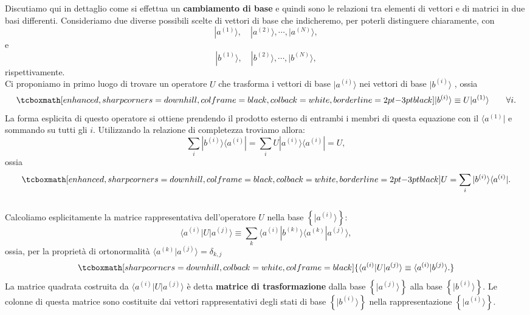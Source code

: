 Discutiamo qui in dettaglio come si effettua un \textbf{cambiamento di base} e quindi sono le relazioni tra elementi di vettori e di matrici in due basi differenti. Consideriamo due diverse possibili scelte di vettori di base che indicheremo, per poterli distinguere chiaramente, con 
	\begin{equation}
		| a^{(1)} \rangle , \quad  | a^{(2)} \rangle , \cdots , | a^{(N)} \rangle ,
	\end{equation}
e
	\begin{equation}
		| b^{(1)} \rangle , \quad | b^{(2)} \rangle , \cdots , | b^{(N)} \rangle ,
	\end{equation}
rispettivamente. \\

Ci proponiamo in primo luogo di trovare un operatore $U$ che trasforma i vettori di base $| a^{(i)} \rangle$ nei vettori di base $| b^{(i)} \rangle $ , ossia 
	\begin{equation}
		\tcboxmath[enhanced, sharp corners=downhill, colframe=black, colback=white, borderline={2pt}{-3pt}{black}]{
			| b^{(i)} \rangle \equiv U | a^{(1)} \rangle 
			}\qquad \forall i .
	\end{equation}
La forma esplicita di questo operatore si ottiene prendendo il prodotto esterno di entrambi i membri di questa equazione con il $\langle a^{(1)}| $ e sommando su tutti gli $i$. Utilizzando la relazione di completezza troviamo allora:
	\begin{equation}
		\sum \limits_{i} | b^{(i)} \rangle \langle a^{(i)} |  = \sum \limits_{i} U | a^{(i)} \rangle \langle a^{(i)} |  = U ,
	\end{equation}
ossia
	\begin{equation}
		\tcboxmath[enhanced, sharp corners=downhill, colframe=black, colback=white, borderline={2pt}{-3pt}{black}]{
			U = \sum \limits_{i} | b^{(i)} \rangle \langle a^{(i)} | .
			}
	\end{equation}\\

Calcoliamo esplicitamente la matrice rappresentativa dell'operatore $U$ nella base $\left\{ | a^{(i)} \rangle    \right\} $:
	\begin{equation}
			\langle a^{(i)} | U | a^{(j)} \rangle \equiv \sum \limits_{k} \langle a^{(i)} | b^{(k)} \rangle  \langle a^{(k)} | a^{(j)} \rangle  ,
	\end{equation}
ossia, per la proprietà di ortonormalità $\langle a^{(k)} | a^{(j)} \rangle  =\delta_{k,j}$
	\begin{equation}
		\tcboxmath[sharp corners=downhill, colback=white, colframe=black]{
			\langle a^{(i)} | U | a^{(j)} \rangle \equiv \langle a^{(i)} | b^{(j)} \rangle .
			}
	\end{equation}
La matrice quadrata costruita da $\langle a^{(i)} | U | a^{(j)} \rangle $ è detta \textbf{matrice di trasformazione} dalla base $\left\{ | a^{(j)} \rangle  \right\}$ alla base $\left\{ | b^{(i)} \rangle  \right\}$. Le colonne di questa matrice sono costituite dai vettori rappresentativi degli stati di base $\left\{ | b^{(i)} \rangle  \right\}$ nella rappresentazione $\left\{ | a^{(i)} \rangle  \right\}$.\\


